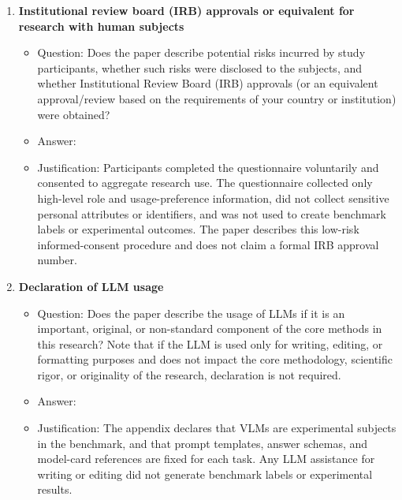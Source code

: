 \begin{enumerate}
\item {\bf Institutional review board (IRB) approvals or equivalent for research with human subjects}
\begin{itemize}
    \item[] Question: Does the paper describe potential risks incurred by study participants, whether such risks were disclosed to the subjects, and whether Institutional Review Board (IRB) approvals (or an equivalent approval/review based on the requirements of your country or institution) were obtained?
    \item[] Answer: \answerYes{}
    \item[] Justification: Participants completed the questionnaire voluntarily and consented to aggregate research use. The questionnaire collected only high-level role and usage-preference information, did not collect sensitive personal attributes or identifiers, and was not used to create benchmark labels or experimental outcomes. The paper describes this low-risk informed-consent procedure and does not claim a formal IRB approval number.
\end{itemize}

\item {\bf Declaration of LLM usage}
\begin{itemize}
    \item[] Question: Does the paper describe the usage of LLMs if it is an important, original, or non-standard component of the core methods in this research? Note that if the LLM is used only for writing, editing, or formatting purposes and does not impact the core methodology, scientific rigor, or originality of the research, declaration is not required.
    \item[] Answer: \answerYes{}
    \item[] Justification: The appendix declares that VLMs are experimental subjects in the benchmark, and that prompt templates, answer schemas, and model-card references are fixed for each task. Any LLM assistance for writing or editing did not generate benchmark labels or experimental results.
\end{itemize}

\end{enumerate}
